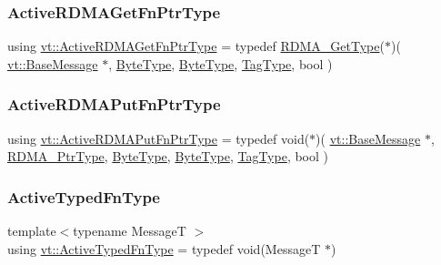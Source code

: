 \subsubsection{\texorpdfstring{Active\+R\+D\+M\+A\+Get\+Fn\+Ptr\+Type}{ActiveRDMAGetFnPtrType}}
{\footnotesize\ttfamily using \hyperlink{namespacevt_ae4fbf97da623bfcd09ee8379de756257}{vt\+::\+Active\+R\+D\+M\+A\+Get\+Fn\+Ptr\+Type} = typedef \hyperlink{namespacevt_a1cab7f4860f65a49ad2c042d6240f288}{R\+D\+M\+A\+\_\+\+Get\+Type}($\ast$)( \hyperlink{namespacevt_ac34f95a5e2b8109b55bfba52b074443d}{vt\+::\+Base\+Message} $\ast$, \hyperlink{namespacevt_aab8d55968084610ce3b17057981e9300}{Byte\+Type}, \hyperlink{namespacevt_aab8d55968084610ce3b17057981e9300}{Byte\+Type}, \hyperlink{namespacevt_a84ab281dae04a52a4b243d6bf62d0e52}{Tag\+Type}, bool )}

\mbox{\label{namespacevt_a23220eaaee4345f7371d35e3aee23c70}} 
\subsubsection{\texorpdfstring{Active\+R\+D\+M\+A\+Put\+Fn\+Ptr\+Type}{ActiveRDMAPutFnPtrType}}
{\footnotesize\ttfamily using \hyperlink{namespacevt_a23220eaaee4345f7371d35e3aee23c70}{vt\+::\+Active\+R\+D\+M\+A\+Put\+Fn\+Ptr\+Type} = typedef void($\ast$)( \hyperlink{namespacevt_ac34f95a5e2b8109b55bfba52b074443d}{vt\+::\+Base\+Message} $\ast$, \hyperlink{namespacevt_a9e2c953286c7616f7c218e9951790776}{R\+D\+M\+A\+\_\+\+Ptr\+Type}, \hyperlink{namespacevt_aab8d55968084610ce3b17057981e9300}{Byte\+Type}, \hyperlink{namespacevt_aab8d55968084610ce3b17057981e9300}{Byte\+Type}, \hyperlink{namespacevt_a84ab281dae04a52a4b243d6bf62d0e52}{Tag\+Type}, bool )}

\mbox{\label{namespacevt_a54eefd5373739c7365058b0d22fea6e2}} 
\subsubsection{\texorpdfstring{Active\+Typed\+Fn\+Type}{ActiveTypedFnType}}
{\footnotesize\ttfamily template$<$typename MessageT $>$ \\
using \hyperlink{namespacevt_a54eefd5373739c7365058b0d22fea6e2}{vt\+::\+Active\+Typed\+Fn\+Type} = typedef void(MessageT $\ast$)}


